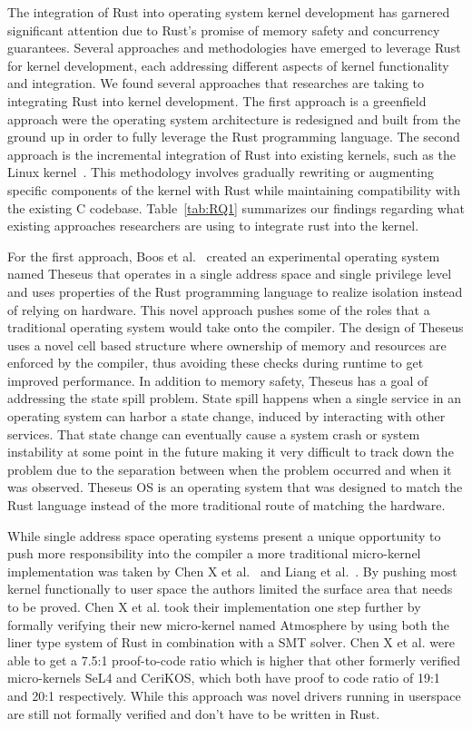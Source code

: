 \documentclass[sigconf,review,anonymous]{acmart}
\begin{document}
The integration of Rust into operating system kernel development has garnered significant attention
due to Rust's promise of memory safety and concurrency guarantees. Several approaches and
methodologies have emerged to leverage Rust for kernel development, each addressing different
aspects of kernel functionality and integration.  We found several approaches that researches are
taking to integrating Rust into kernel development.  The first approach is a greenfield approach
were the operating system architecture is redesigned and built from the ground up in order to fully
leverage the Rust programming language. The second approach is the incremental integration of Rust
into existing kernels, such as the Linux
kernel~\cite{The_kernel_development_community_undated-iw}. This methodology involves gradually
rewriting or augmenting specific components of the kernel with Rust while maintaining compatibility
with the existing C codebase. Table~\ref{tab:RQ1} summarizes our findings regarding what existing
approaches researchers are using to integrate rust into the kernel.

For the first approach, Boos et al.~\cite{Boos2020-zh} created an experimental operating system
named Theseus that operates in a single address space and single privilege level and uses properties
of the Rust programming language to realize isolation instead of relying on hardware. This novel
approach pushes some of the roles that a traditional operating system would take onto the
compiler. The design of Theseus uses a novel cell based structure where ownership of memory and
resources are enforced by the compiler, thus avoiding these checks during runtime to get improved
performance. In addition to memory safety, Theseus has a goal of addressing the state spill
problem. State spill happens when a single service in an operating system can harbor a state change,
induced by interacting with other services. That state change can eventually cause a system crash or
system instability at some point in the future making it very difficult to track down the problem
due to the separation between when the problem occurred and when it was observed. Theseus OS is an
operating system that was designed to match the Rust language instead of the more traditional route
of matching the hardware.

While single address space operating systems present a unique opportunity to push more
responsibility into the compiler a more traditional micro-kernel implementation was taken by Chen X
et al.~\cite{Chen2023-wb} and Liang et al.~\cite{Liang2021-bo}. By pushing most kernel functionally
to user space the authors limited the surface area that needs to be proved. Chen X et al. took
their implementation one step further by formally verifying their new micro-kernel named Atmosphere
by using both the liner type system of Rust in combination with a SMT solver. Chen X et al. were
able to get a 7.5:1 proof-to-code ratio which is higher that other formerly verified micro-kernels
SeL4 and CeriKOS, which both have proof to code ratio of 19:1 and 20:1 respectively. While this
approach was novel drivers running in userspace are still not formally verified and don't have to be
written in Rust.
\end{document}
